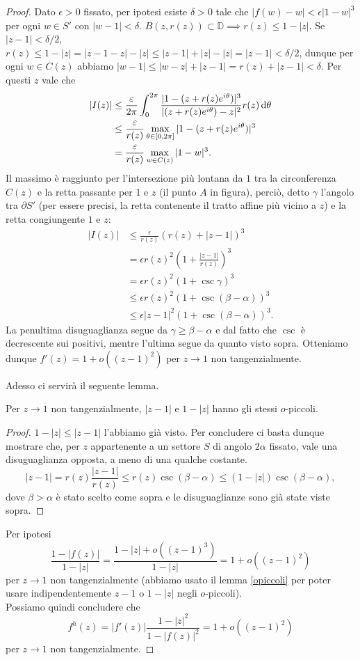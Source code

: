 \begin{proof}
  Dato $\epsilon>0$ fissato, per ipotesi esiste $\delta>0$ tale che $|f(w)-w|<\epsilon|1-w|^3$ per ogni $w \in S'$ con $|w-1|<\delta$. $B(z,r(z)) \subset \mathbb{D} \implies r(z) \le 1-|z|$. Se $|z-1|<\delta/2$, $r(z) \le 1-|z|=|z-1-z|-|z| \le |z-1|+|z|-|z|=|z-1|<\delta/2$, dunque per ogni $w \in C(z)$ abbiamo $|w-1| \le |w-z|+|z-1|=r(z)+|z-1|<\delta$. Per questi $z$ vale che
  \begin{align*}
    |I(z)| & \le \frac{\varepsilon}{2\pi} \int_0^{2\pi} \frac{|1-(z+r(z)e^{i\theta})|^3}{|(z+r(z)e^{i\theta})-z|^2}r(z)\mathop{}\!\mathrm{d}\theta \\
    & \le \frac{\varepsilon}{r(z)}\max_{\theta \in [0,2\pi]} |1-(z+r(z)e^{i\theta})|^3 \\
    & =\frac{\varepsilon}{r(z)}\max_{w \in C(z)}|1-w|^3.
  \end{align*}
  Il massimo è raggiunto per l'intersezione più lontana da $1$ tra la circonferenza $C(z)$ e la retta passante per $1$ e $z$ (il punto $A$ in figura), perciò, detto $\gamma$ l'angolo tra $\partial S'$ (per essere precisi, la retta contenente il tratto affine più vicino a $z$) e la retta congiungente $1$ e $z$:
  \begin{align*}
    |I(z)| & \le \frac{\epsilon}{r(z)}(r(z)+|z-1|)^3 \\
    & =\epsilon r(z)^2\left(1+\frac{|z-1|}{r(z)}\right)^3 \\
    & =\epsilon r(z)^2(1+\csc\gamma)^3 \\
    & \le \epsilon r(z)^2(1+\csc(\beta-\alpha))^3 \\
    & \le \epsilon |z-1|^2(1+\csc(\beta-\alpha))^3.
  \end{align*}
  La penultima disuguaglianza segue da $\gamma \ge \beta-\alpha$ e dal fatto che $\csc$ è decrescente sui positivi, mentre l'ultima segue da quanto visto sopra. Otteniamo dunque $f'(z)=1+o((z-1)^2)$ per $z \longrightarrow 1$ non tangenzialmente.

  Adesso ci servirà il seguente lemma.

  \begin{lm} \label{opiccoli}
    Per $z \longrightarrow 1$ non tangenzialmente, $|z-1|$ e $1-|z|$ hanno gli stessi $o$-piccoli.
  \end{lm}

  \begin{proof}
    $1-|z| \le |z-1|$ l'abbiamo già visto. Per concludere ci basta dunque mostrare che, per $z$ appartenente a un settore $S$ di angolo $2\alpha$ fissato, vale una disuguaglianza opposta, a meno di una qualche costante.
    $$|z-1|=r(z)\frac{|z-1|}{r(z)} \le r(z)\csc(\beta-\alpha) \le (1-|z|)\csc(\beta-\alpha),$$
    dove $\beta>\alpha$ è stato scelto come sopra e le disuguaglianze sono già state viste sopra.
  \end{proof}

  Per ipotesi
  $$\frac{1-|f(z)|}{1-|z|}=\frac{1-|z|+o((z-1)^3)}{1-|z|}=1+o((z-1)^2)$$
  per $z \longrightarrow 1$ non tangenzialmente (abbiamo usato il lemma \ref{opiccoli} per poter usare indipendentemente $z-1$ o $1-|z|$ negli $o$-piccoli). \\
  Possiamo quindi concludere che
  $$f^h(z)=|f'(z)|\frac{1-|z|^2}{1-|f(z)|^2}=1+o((z-1)^2)$$
  per $z \longrightarrow 1$ non tangenzialmente.
\end{proof}
